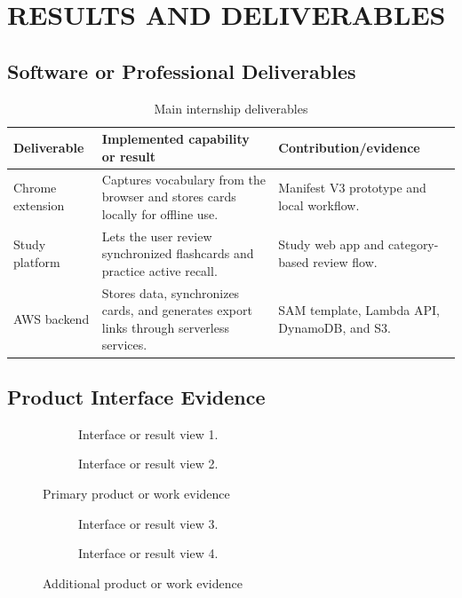 \chapter{RESULTS AND DELIVERABLES}

\section{Software or Professional Deliverables}

\begin{table}[H]
  \centering
  \caption{Main internship deliverables}
  \begin{tabularx}{\textwidth}{@{}P{3.0cm}YP{4.2cm}@{}}
    \toprule
    \textbf{Deliverable} & \textbf{Implemented capability or result} &
    \textbf{Contribution/evidence} \\
    \midrule
    Chrome extension & Captures vocabulary from the browser and stores cards
      locally for offline use. & Manifest V3 prototype and local workflow. \\
    \addlinespace
    Study platform & Lets the user review synchronized flashcards and practice
      active recall. & Study web app and category-based review flow. \\
    \addlinespace
    AWS backend & Stores data, synchronizes cards, and generates export links
      through serverless services. & SAM template, Lambda API, DynamoDB, and S3. \\
    \bottomrule
  \end{tabularx}
\end{table}

\section{Product Interface Evidence}

\begin{figure}[H]
  \centering
  \begin{subfigure}[t]{0.47\textwidth}
    \centering
    \placeholderbox[0.9\linewidth]{4.3cm}
    \caption{Interface or result view 1.}
  \end{subfigure}\hfill
  \begin{subfigure}[t]{0.47\textwidth}
    \centering
    \placeholderbox[0.9\linewidth]{4.3cm}
    \caption{Interface or result view 2.}
  \end{subfigure}
  \caption{Primary product or work evidence}
\end{figure}

\begin{figure}[H]
  \centering
  \begin{subfigure}[t]{0.47\textwidth}
    \centering
    \placeholderbox[0.9\linewidth]{4.3cm}
    \caption{Interface or result view 3.}
  \end{subfigure}\hfill
  \begin{subfigure}[t]{0.47\textwidth}
    \centering
    \placeholderbox[0.9\linewidth]{4.3cm}
    \caption{Interface or result view 4.}
  \end{subfigure}
  \caption{Additional product or work evidence}
\end{figure}

